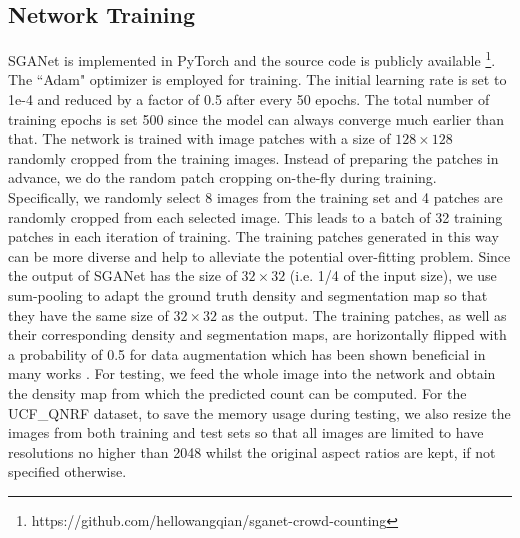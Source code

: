 \documentclass[journal,comsoc]{IEEEtran}
\begin{document}
\subsection{Network Training}
SGANet is implemented in PyTorch \cite{paszke2017automatic} and the source code is publicly available \footnote{https://github.com/hellowangqian/sganet-crowd-counting}. The ``Adam" optimizer \cite{kingma2014adam} is employed for training. The initial learning rate is set to 1e-4 and reduced by a factor of 0.5 after every 50 epochs. The total number of training epochs is set 500 since the model can always converge much earlier than that. The network is trained with image patches with a size of $128\times 128$ randomly cropped from the training images. Instead of preparing the patches in advance, we do the random patch cropping on-the-fly during training. Specifically, we randomly select 8 images from the training set and 4 patches are randomly cropped from each selected image. This leads to a batch of 32 training patches in each iteration of training. The training patches generated in this way can be more diverse and help to alleviate the potential over-fitting problem. Since the output of SGANet has the size of $32\times 32$ (i.e. 1/4 of the input size), we use sum-pooling to adapt the ground truth density and segmentation map so that they have the same size of $32\times 32$ as the output. The training patches, as well as their corresponding density and segmentation maps, are horizontally flipped with a probability of 0.5 for data augmentation which has been shown beneficial in many works \cite{guo2019dadnet,zhang2019relational}. For testing, we feed the whole image into the network and obtain the density map from which the predicted count can be computed. For the UCF\_QNRF dataset, to save the memory usage during testing, we also resize the images from both training and test sets so that all images are limited to have resolutions no higher than 2048 whilst the original aspect ratios are kept, if not specified otherwise.
\end{document}
